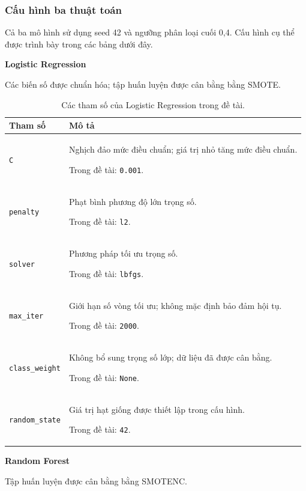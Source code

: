 \documentclass[a4paper]{article}
\begin{document}
\subsubsection{Cấu hình ba thuật toán}
Cả ba mô hình sử dụng seed 42 và ngưỡng phân loại cuối 0,4. Cấu hình cụ thể được trình bày trong các bảng dưới đây.

\noindent\textbf{Logistic Regression}\par
Các biến số được chuẩn hóa; tập huấn luyện được cân bằng bằng SMOTE.

\begin{table}[H]
\centering
\small
\caption{Các tham số của Logistic Regression trong đề tài.}
\label{tab:lr-parameters}
\begin{tabularx}{\textwidth}{|p{3.7cm}|X|}
\hline
\textbf{Tham số} & \textbf{Mô tả} \\ \hline
\texttt{C} & Nghịch đảo mức điều chuẩn; giá trị nhỏ tăng mức điều chuẩn.\par\smallskip Trong đề tài: \texttt{0.001}. \\ \hline
\texttt{penalty} & Phạt bình phương độ lớn trọng số.\par\smallskip Trong đề tài: \texttt{l2}. \\ \hline
\texttt{solver} & Phương pháp tối ưu trọng số.\par\smallskip Trong đề tài: \texttt{lbfgs}. \\ \hline
\texttt{max\_iter} & Giới hạn số vòng tối ưu; không mặc định bảo đảm hội tụ.\par\smallskip Trong đề tài: \texttt{2000}. \\ \hline
\texttt{class\_weight} & Không bổ sung trọng số lớp; dữ liệu đã được cân bằng.\par\smallskip Trong đề tài: \texttt{None}. \\ \hline
\texttt{random\_state} & Giá trị hạt giống được thiết lập trong cấu hình.\par\smallskip Trong đề tài: \texttt{42}. \\ \hline
\end{tabularx}
\end{table}

\noindent\textbf{Random Forest}\par
Tập huấn luyện được cân bằng bằng SMOTENC.
\end{document}
